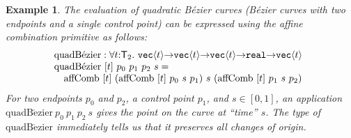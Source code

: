\documentclass{sigplanconf}
\newcommand{\SynTransl}[1]{\mathsf{T}_#1}
\newcommand{\tyPrim}[2]{\textup{\texttt{#1}}\langle #2 \rangle}
\newcommand{\tyPrimNm}[1]{\textup{\texttt{#1}}}
\theoremstyle{examplestyle}
\newtheorem{example}{Example}
\theoremstyle{restatementstyle}
\begin{document}
\begin{example}
  The evaluation of quadratic B\'{e}zier curves (B\'{e}zier curves
  with two endpoints and a single control point) can be expressed
  using the affine combination primitive as follows: %
  \begin{displaymath}
    \begin{array}{@{}l}
      \mathrm{quadB\acute{e}zier} : \forall t
      \mathord:\SynTransl{2}.\ \tyPrim{vec}{t} \mathord\to \tyPrim{vec}{t}\mathord\to
      \tyPrim{vec}{t} \mathord\to \tyPrimNm{real} \mathord\to \tyPrim{vec}{t}
      \\ \mathrm{quadB\acute{e}zier}\ [t]\ p_0\ p_1\ p_2\ s = \\ \quad
      \mathrm{affComb}\ [t]\ (\mathrm{affComb}\ [t]\ p_0\ s\ p_1)\ s\ (\mathrm{affComb}\ [t]\ p_1\ s\ p_2)
      \\
    \end{array}
  \end{displaymath}
  For two endpoints $p_0$ and $p_2$, a control point $p_1$, and $s \in
  [0,1]$, an application
  $\mathrm{quadB\acute{e}zier}\ p_0\ p_1\ p_2\ s$ gives the point on
  the curve at ``time'' $s$.  The type of
  $\mathrm{quadB\acute{e}zier}$ immediately tells us that it preserves
  all changes of origin.
\end{example}
\end{document}
